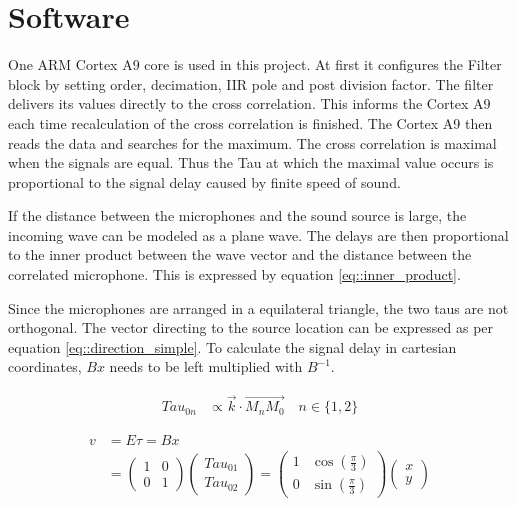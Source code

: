 \section{Software}
\label{sec::software}

One ARM Cortex A9 core is used in this project.
At first it configures the Filter block by setting order, decimation, IIR pole and post division factor.
The filter delivers its values directly to the cross correlation.
This informs the Cortex A9 each time recalculation of the cross correlation is finished.
The Cortex A9 then reads the data and searches for the maximum.
The cross correlation is maximal when the signals are equal.
Thus the Tau at which the maximal value occurs is proportional to the signal delay caused by finite speed of sound.

If the distance between the microphones and the sound source is large, the incoming wave can be modeled as a plane wave.
The delays are then proportional to the inner product between the wave vector and the  distance between the correlated microphone.
This is expressed by equation \ref{eq::inner_product}.

Since the microphones are arranged in a equilateral triangle, the two taus are not orthogonal.
The vector directing to the source location can be expressed as per equation \ref{eq::direction_simple}.
To calculate the signal delay in cartesian coordinates, $Bx$ needs to be left multiplied with $B^{-1}$.

\begin{align}
	{Tau}_{0n} &\propto \overrightarrow{k} \cdot \overrightarrow{M_nM_0} \quad n\in\{1,2\}\label{eq::inner_product}
\end{align}

\begin{align}
	v 	&= E\tau = Bx \label{eq::direction_simple}\\
		&= \begin{pmatrix} 1 & 0 \\ 0 & 1\end{pmatrix} \begin{pmatrix} {Tau}_{01} \\ {Tau}_{02}\end{pmatrix}
		=  \begin{pmatrix} 1 & \cos(\frac{\pi}{3}) \\ 0 & \sin(\frac{\pi}{3})\end{pmatrix} \begin{pmatrix} x \\ y\end{pmatrix}
\end{align}

